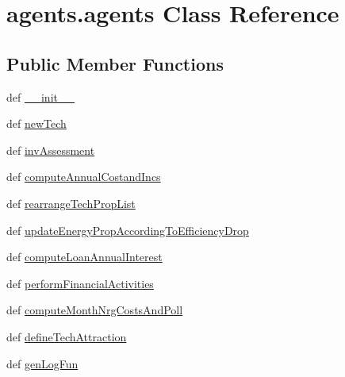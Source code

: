 \hypertarget{classagents_1_1agents}{\section{agents.\-agents Class Reference}
\label{classagents_1_1agents}
}
\subsection*{Public Member Functions}
\begin{DoxyCompactItemize}
\item 
def \hyperlink{classagents_1_1agents_a9e92841f127ede0a22e375027db00e58}{\-\_\-\-\_\-init\-\_\-\-\_\-}
\item 
def \hyperlink{classagents_1_1agents_a24e3d9306189799e6dd2d380d48f1cfa}{new\-Tech}
\item 
def \hyperlink{classagents_1_1agents_a7b74e3b04b010a744eb90a362b30aaba}{inv\-Assessment}
\item 
def \hyperlink{classagents_1_1agents_addb2bc2ec420b4aee6eaed5eb90dbe93}{compute\-Annual\-Costand\-Incs}
\item 
def \hyperlink{classagents_1_1agents_adee51a8436db7c21b2f8af2707b74111}{rearrange\-Tech\-Prop\-List}
\item 
def \hyperlink{classagents_1_1agents_aad56aad1fd30adfc309d0469033aedf4}{update\-Energy\-Prop\-According\-To\-Efficiency\-Drop}
\item 
def \hyperlink{classagents_1_1agents_ab517934fafeea38b8fe54b49dd8a40e9}{compute\-Loan\-Annual\-Interest}
\item 
def \hyperlink{classagents_1_1agents_a2e19e3c5ef0d8d57a8e9ed2c604f4efb}{perform\-Financial\-Activities}
\item 
def \hyperlink{classagents_1_1agents_a248ef44e1ab82331aa4db6af2bea4f76}{compute\-Month\-Nrg\-Costs\-And\-Poll}
\item 
def \hyperlink{classagents_1_1agents_a44851372d66f11f4827ad88c69570a29}{define\-Tech\-Attraction}
\item 
def \hyperlink{classagents_1_1agents_ad4e551562ac4b27727c134ba7e192d66}{gen\-Log\-Fun}
\end{DoxyCompactItemize}
